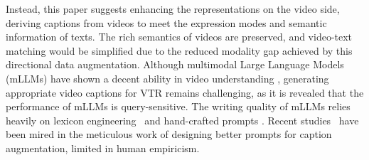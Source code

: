 Instead, this paper suggests enhancing the representations on the video side, deriving captions from videos to meet the expression modes and semantic information of texts. The rich semantics of videos are preserved, and video-text matching would be simplified due to the reduced modality gap achieved by this directional data augmentation.
Although multimodal Large Language Models (mLLMs) have shown a decent ability in video understanding \cite{cap4video++}, generating appropriate video captions for VTR remains challenging, as it is revealed that the performance of mLLMs is query-sensitive. The writing quality of mLLMs relies heavily on lexicon engineering~\cite{parashar2024neglected} and hand-crafted prompts \cite{momeni2023verbs}. Recent studies~\cite{bansal2024videocon,wang2024havtr} have been mired in the meticulous work of designing better prompts for caption augmentation, limited in human empiricism. 



